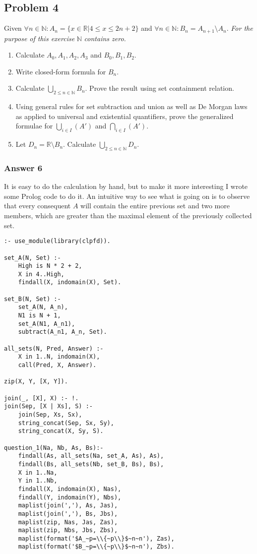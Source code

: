 \documentclass[11pt]{article}
\begin{document}
\subsection{Problem 4}
\label{sec-1-4}
Given $\forall n \in \mathbb{N}: A_n = \{x \in \mathbb{R} | 4 \leq x \leq
   2n + 2 \}$ and $\forall n \in \mathbb{N}: B_n = A_{n+1} \setminus A_n$.
\emph{For the purpose of this exercise} $\mathbb{N}$ \emph{contains zero.}
\begin{enumerate}
\item Calculate $A_0, A_1, A_2, A_3$ and $B_0, B_1, B_2$.
\item Write closed-form formula for $B_n$.
\item Calculate $\bigcup_{2 \leq n \in \mathbb{N}}B_n$.  Prove the result
using set containment relation.
\item Using general rules for set subtraction and union as well as De Morgan
laws as applied to universal and existential quantifiers, prove the
generalized formulae for $\bigcup_{i \in I}(A')$ and 
$\bigcap_{i \in I}(A')$.
\item Let $D_n = \mathbb{R} \setminus B_n$.  Calculate 
      $\bigcup_{2 \leq n \in \mathbb{N}}D_n$.
\end{enumerate}

\subsubsection{Answer 6}
\label{sec-1-4-1}
It is easy to do the calculation by hand, but to make it more interesting
I wrote some Prolog code to do it.  An intuitive way to see what is going
on is to observe that every consequent $A$ will contain the entire previous
set and two more members, which are greater than the maximal element of
the previously collected set.

\lstset{language=prolog,numbers=none}
\begin{lstlisting}
:- use_module(library(clpfd)).

set_A(N, Set) :- 
    High is N * 2 + 2,
    X in 4..High,
    findall(X, indomain(X), Set).

set_B(N, Set) :-
    set_A(N, A_n),
    N1 is N + 1,
    set_A(N1, A_n1),
    subtract(A_n1, A_n, Set).

all_sets(N, Pred, Answer) :-
    X in 1..N, indomain(X),
    call(Pred, X, Answer).

zip(X, Y, [X, Y]).

join(_, [X], X) :- !.
join(Sep, [X | Xs], S) :-
    join(Sep, Xs, Sx),
    string_concat(Sep, Sx, Sy),
    string_concat(X, Sy, S).

question_1(Na, Nb, As, Bs):-
    findall(As, all_sets(Na, set_A, As), As),
    findall(Bs, all_sets(Nb, set_B, Bs), Bs),
    X in 1..Na,
    Y in 1..Nb,
    findall(X, indomain(X), Nas),
    findall(Y, indomain(Y), Nbs),
    maplist(join(','), As, Jas),
    maplist(join(','), Bs, Jbs),
    maplist(zip, Nas, Jas, Zas),
    maplist(zip, Nbs, Jbs, Zbs),
    maplist(format('$A_~p=\\{~p\\}$~n~n'), Zas),
    maplist(format('$B_~p=\\{~p\\}$~n~n'), Zbs).
\end{lstlisting}
\end{document}
